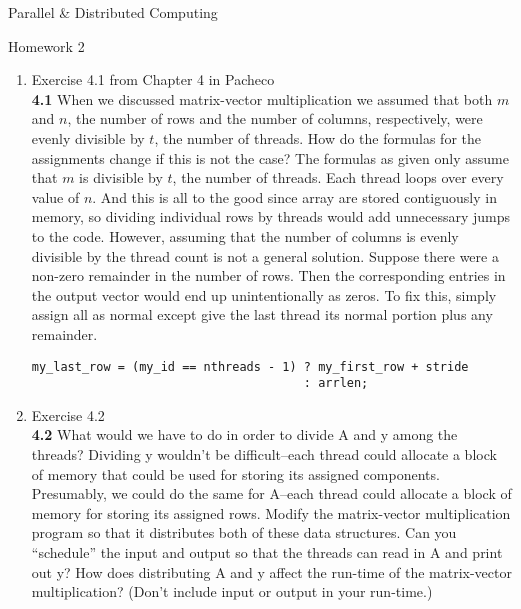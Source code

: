 \documentclass[11pt,epsfig,letterpaper]{article}
\begin{document}

    \vspace{5pc}
    \centerline{\huge Parallel \& Distributed Computing}
    \vspace{0.5pc}
    \centerline{\huge Homework 2}
    \vspace{3pc}


    \begin{enumerate}

            \item Exercise 4.1 from Chapter 4 in Pacheco \\
            {\bf 4.1} \>\> When we discussed matrix-vector multiplication we assumed that both $m$ and $n$, the number of rows and the number of columns, respectively, were evenly divisible by $t$, the number of threads. How do the formulas for the assignments change if this is not the case?
            \vspace{0.5pc}
            \quad The formulas as given only assume that $m$ is divisible by $t$, the number of threads. Each thread loops over every value of $n$. And this is all to the good since array are stored contiguously in memory, so dividing individual rows by threads would add unnecessary jumps to the code.
            \quad However, assuming that the number of columns is evenly divisible by the thread count is not a general solution. Suppose there were a non-zero remainder in the number of rows. Then the corresponding entries in the output vector would end up unintentionally as zeros.
            \quad To fix this, simply assign all as normal except give the last thread its normal portion plus any remainder.
            \begin{verbatim}
my_last_row = (my_id == nthreads - 1) ? my_first_row + stride
                                      : arrlen;
            \end{verbatim}


            \item Exercise 4.2 \\
            {\bf 4.2}\>\> What would we have to do in order to divide A and y among the threads? Dividing y wouldn’t be difficult–each thread could allocate a block of memory that could be used for storing its assigned components. Presumably, we could do the same for A–each thread could allocate a block of memory for storing its assigned rows. Modify the matrix-vector multiplication program so that it distributes both of these data structures. Can you “schedule” the input and output so that the threads can read in A and print out y?
            How does distributing A and y affect the run-time of the matrix-vector multiplication? (Don’t include input or output in your run-time.)
            \vspace{0.5pc}


\end{enumerate}
\end{document}
